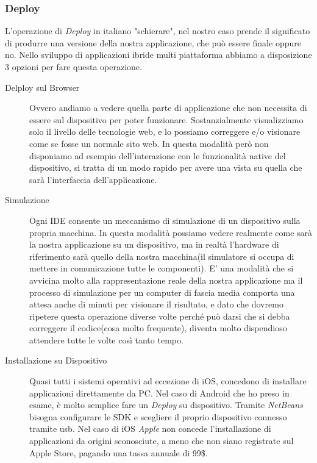 \subsubsection{Deploy}
L'operazione di \emph{Deploy} in italiano "schierare", nel nostro caso prende il significato di produrre una versione della nostra applicazione, che può essere finale oppure no. Nello sviluppo di applicazioni ibride multi piattaforma abbiamo a disposizione 3 opzioni per fare questa operazione.

\begin{description}
\item[Delploy sul Browser] Ovvero andiamo a vedere quella parte di applicazione che non necessita di essere sul dispositivo per poter funzionare. Sostanzialmente visualizziamo solo il livello delle tecnologie web, e lo possiamo correggere e/o visionare come se fosse un normale sito web. In questa modalità però non disponiamo ad esempio dell'interazione con le funzionalità native del dispositivo, si tratta di un modo rapido per avere una vista su quella che sarà l'interfaccia dell'applicazione.

\item[Simulazione] Ogni IDE consente un meccanismo di simulazione di un dispositivo sulla propria macchina. In questa modalità possiamo vedere realmente come sarà la nostra applicazione su un dispositivo, ma in realtà l'hardware di riferimento sarà quello della nostra macchina(il simulatore si occupa di mettere in comunicazione tutte le componenti). E' una modalità che si avvicina molto alla rappresentazione reale della nostra applicazione ma il processo di simulazione per un computer di fascia media comporta una attesa anche di minuti per visionare il risultato, e dato che dovremo ripetere questa operazione diverse volte perché può darsi che si debba correggere il codice(cosa molto frequente), diventa molto dispendioso attendere tutte le volte così tanto tempo.

\item[Installazione su Dispositivo] Quasi tutti i sistemi operativi ad eccezione di iOS, concedono di installare applicazioni direttamente da PC. Nel caso di Android che ho preso in esame, è molto semplice fare un \emph{Deploy} su dispositivo. Tramite \emph{NetBeans} bisogna configurare le SDK e scegliere il proprio dispositivo connesso tramite usb. Nel caso di iOS \emph{Apple} non concede l'installazione di applicazioni da origini sconosciute, a meno che non siano registrate sul Apple Store, pagando una tassa annuale di 99\$.

\end{description}

